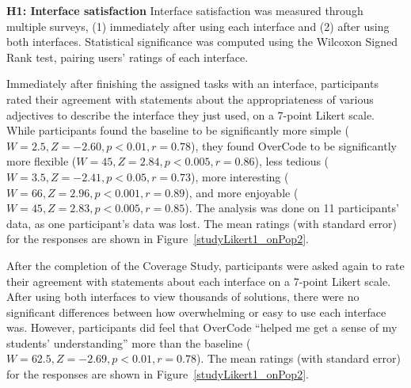 {\bf H1: Interface satisfaction} Interface satisfaction was measured through multiple surveys, (1) immediately after using each interface and (2) after using both interfaces. Statistical significance was computed using the Wilcoxon Signed Rank test, pairing users' ratings of each interface. 

Immediately after finishing the assigned tasks with an interface, participants rated their agreement with statements about the appropriateness of various adjectives to describe the interface they just used, on a 7-point Likert scale. While participants found the baseline to be significantly more simple ($W=2.5, Z=-2.60, p<0.01, r=0.78$), they found OverCode to be significantly more flexible ($W=45, Z=2.84, p<0.005, r=0.86$), less tedious ($W=3.5, Z=-2.41, p<0.05, r=0.73$), more interesting ($W=66, Z=2.96, p<0.001, r=0.89$), and more enjoyable ($W=45, Z=2.83, p<0.005, r=0.85$). The analysis was done on 11 participants' data, as one participant's data was lost. The mean ratings (with standard error) for the responses are shown in Figure~\ref{studyLikert1_onPop2}. 

After the completion of the Coverage Study, participants were asked again to rate their agreement with statements about each interface on a 7-point Likert scale. After using both interfaces to view thousands of solutions, there were no significant differences between how overwhelming or easy to use each interface was. However, participants did feel that OverCode ``helped me get a sense of my students' understanding'' more than the baseline ($W=62.5, Z=-2.69, p<0.01, r=0.78$). The mean ratings (with standard error) for the responses are shown in Figure~\ref{studyLikert1_onPop2}.

